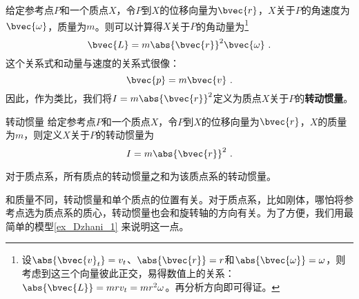 给定参考点$P$和一个质点$X$，令$P$到$X$的位移向量为$\bvec{r}$，$X$关于$P$的角速度为$\bvec{\omega}$，质量为$m$。则可以计算得$X$关于$P$的角动量为\footnote{设$\abs{\bvec{v}_t}=v_t$、$\abs{\bvec{r}}=r$和$\abs{\bvec{\omega}}=\omega$，则考虑到这三个向量彼此正交，易得数值上的关系：$\abs{\bvec{L}}=mrv_t=m r^2 \omega$。再分析方向即可得证。}
\begin{equation}
\bvec{L} = m\abs{\bvec{r}}^2\bvec{\omega}~. 
\end{equation}
这个关系式和动量与速度的关系式很像：
\begin{equation}
\bvec{p} = m\bvec{v}~. 
\end{equation}
因此，作为类比，我们将$I=m\abs{\bvec{r}}^2$定义为质点$X$关于$P$的\textbf{转动惯量}。



\begin{definition}{转动惯量}
给定参考点$P$和一个质点$X$，令$P$到$X$的位移向量为$\bvec{r}$，$X$的质量为$m$，则定义$X$关于$P$的转动惯量为
\begin{equation}
I=m\abs{\bvec{r}}^2~. 
\end{equation}

对于质点系，所有质点的转动惯量之和为该质点系的转动惯量。
\end{definition}


和质量不同，转动惯量和单个质点的位置有关。对于质点系，比如刚体，哪怕将参考点选为质点系的质心，转动惯量也会和旋转轴的方向有关。为了方便，我们用最简单的模型\autoref{ex_Dzhani_1} 来说明这一点。



